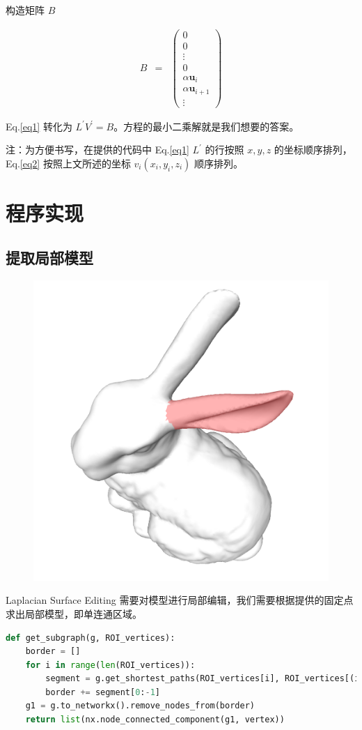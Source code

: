 \documentclass[lang=cn,11pt,a4paper]{elegantpaper}
\begin{document}
构造矩阵 $B$

\begin{eqnarray}
B & = & \left(\begin{array}{c}
0 \\
0 \\
\vdots \\
0 \\
\alpha \mathbf{u}_{i} \\
\alpha \mathbf{u}_{i+1} \\
\vdots
\end{array}\right)
\end{eqnarray}

Eq.\eqref{eq1} 转化为 $L^{\prime}V^{\prime} = B$。方程的最小二乘解就是我们想要的答案。

注：为方便书写，在提供的代码中 Eq.\eqref{eq1} $L^{\prime}$ 的行按照 $x, y, z$ 的坐标顺序排列，Eq.\eqref{eq2} 按照上文所述的坐标 ${v}_{i} ( x_i, y_i, z_i )$ 顺序排列。

\section{程序实现}

\subsection{提取局部模型}

\begin{figure}[ht]
\centering
\includegraphics[width=0.33\linewidth]{image/selected_model.png} 
\end{figure}

Laplacian Surface Editing 需要对模型进行局部编辑，我们需要根据提供的固定点求出局部模型，即单连通区域。

\begin{lstlisting}[language=Python]
def get_subgraph(g, ROI_vertices):
    border = []
    for i in range(len(ROI_vertices)):
        segment = g.get_shortest_paths(ROI_vertices[i], ROI_vertices[(i+1)%n], output='vpath')[0]
        border += segment[0:-1]
    g1 = g.to_networkx().remove_nodes_from(border)
    return list(nx.node_connected_component(g1, vertex))
\end{lstlisting}
\end{document}

